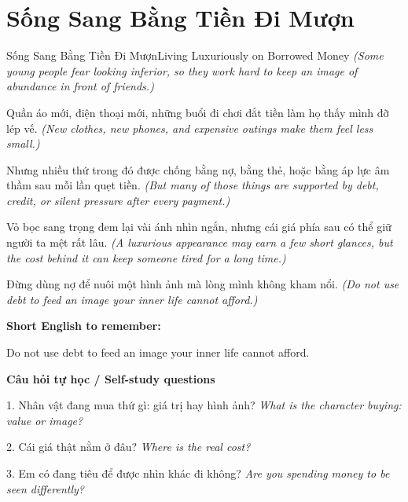 \section{Sống Sang Bằng Tiền Đi Mượn}
\begin{truyen}{Sống Sang Bằng Tiền Đi Mượn}{Living Luxuriously on Borrowed Money}
\textit{(Some young people fear looking inferior, so they work hard to keep an image of abundance in front of friends.)}

Quần áo mới, điện thoại mới, những buổi đi chơi đắt tiền làm họ thấy mình đỡ lép vế.
\textit{(New clothes, new phones, and expensive outings make them feel less small.)}

Nhưng nhiều thứ trong đó được chống bằng nợ, bằng thẻ, hoặc bằng áp lực âm thầm sau mỗi lần quẹt tiền.
\textit{(But many of those things are supported by debt, credit, or silent pressure after every payment.)}

Vỏ bọc sang trọng đem lại vài ánh nhìn ngắn, nhưng cái giá phía sau có thể giữ người ta mệt rất lâu.
\textit{(A luxurious appearance may earn a few short glances, but the cost behind it can keep someone tired for a long time.)}

\end{truyen}

\begin{baihoc}
Đừng dùng nợ để nuôi một hình ảnh mà lòng mình không kham nổi.
\textit{(Do not use debt to feed an image your inner life cannot afford.)}
\end{baihoc}

\begin{ghinhoanh}
\textbf{Short English to remember:}

Do not use debt to feed an image your inner life cannot afford.

\end{ghinhoanh}

\begin{tuhocnhanh}
\textbf{Câu hỏi tự học / Self-study questions}

1. Nhân vật đang mua thứ gì: giá trị hay hình ảnh? \textit{What is the character buying: value or image?}

2. Cái giá thật nằm ở đâu? \textit{Where is the real cost?}

3. Em có đang tiêu để được nhìn khác đi không? \textit{Are you spending money to be seen differently?}
\end{tuhocnhanh}
\ngancach

